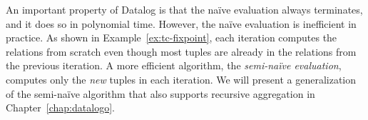An important property of Datalog is that the na\"ive evaluation 
 always terminates, and it does so in polynomial time.
However, the na\"ive evaluation is inefficient in practice.
As shown in Example~\ref{ex:tc-fixpoint},
 each iteration computes the relations from scratch 
 even though most tuples are already in the relations from the previous iteration.
A more efficient algorithm, the {\em semi-na\"ive evaluation},
 computes only the {\em new} tuples in each iteration.
We will present a generalization of the semi-na\"ive algorithm 
 that also supports recursive aggregation in Chapter~\ref{chap:datalogo}.
